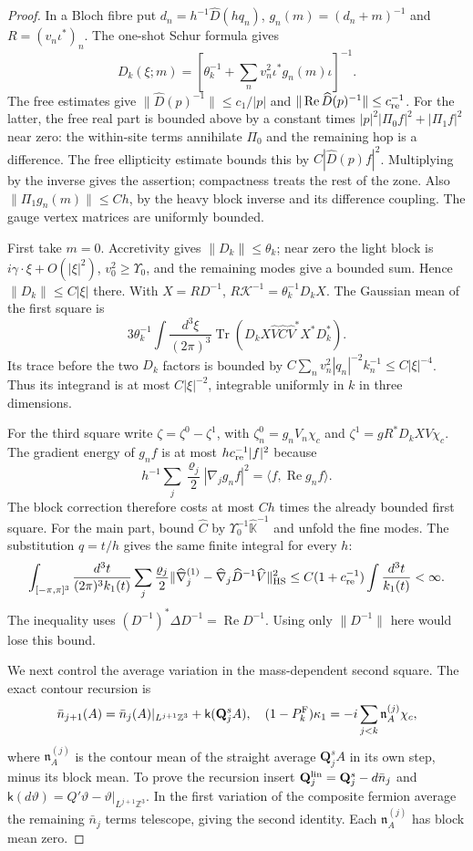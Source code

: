 \documentclass[11pt,letterpaper,reqno]{amsart}
\theoremstyle{definition}
\theoremstyle{remark}
\begin{document}
\begin{proof}
In a Bloch fibre put $d_n=h^{-1}\widehat D(hq_n)$,
$g_n(m)=(d_n+m)^{-1}$ and $R=(v_n\iota^*)_n$.
The one-shot Schur formula gives
\[
 D_k(\xi;m)=
 [\theta_k^{-1}+\sum_nv_n^2\iota^*g_n(m)\iota]^{-1}.
\]
The free estimates give
$\|\widehat D(p)^{-1}\|\le c_1/|p|$ and
$\|\operatorname{Re}\widehat D(p)^{-1}\|\le c_{\rm re}^{-1}$.
For the latter, the free real part is bounded above by a
constant times $|p|^2|\Pi_0f|^2+|\Pi_1f|^2$ near zero:
the within-site terms annihilate $\Pi_0$ and the remaining
hop is a difference.  The free ellipticity estimate bounds
this by $C|\widehat D(p)f|^2$.  Multiplying by the inverse
gives the assertion; compactness treats the rest of the zone.
Also $\|\Pi_1g_n(m)\|\le Ch$, by the heavy block inverse
and its difference coupling.  The gauge vertex matrices are
uniformly bounded.

First take $m=0$.  Accretivity gives $\|D_k\|\le\theta_k$;
near zero the light block is $i\gamma\cdot\xi+O(|\xi|^2)$,
$v_0^2\ge\Upsilon_0$, and the remaining modes give a bounded
sum.  Hence $\|D_k\|\le C|\xi|$ there.  With $X=RD^{-1}$,
$R\mathcal K^{-1}=\theta_k^{-1}D_kX$.
The Gaussian mean of the first square is
\[
 3\theta_k^{-1}\int\frac{d^3\xi}{(2\pi)^3}
 \operatorname{Tr}(D_kX\widehat V\widehat C
                    \widehat V^*X^*D_k^*).
\]
Its trace before the two $D_k$ factors is bounded by
$C\sum_nv_n^2|q_n|^{-2}k_n^{-1}\le C|\xi|^{-4}$.
Thus its integrand is at most $C|\xi|^{-2}$, integrable
uniformly in $k$ in three dimensions.

For the third square write
$\zeta=\zeta^0-\zeta^1$, with
$\zeta_n^0=g_nV_n\chi_c$ and
$\zeta^1=gR^*D_kX V\chi_c$.
The gradient energy of $g_nf$ is at most
$hc_{\rm re}^{-1}|f|^2$ because
\[
 h^{-1}\sum_j\frac{\varrho_j}2|\nabla_jg_nf|^2
       =\langle f,\operatorname{Re}g_nf\rangle.
\]
The block correction therefore costs at most $Ch$ times the
already bounded first square.  For the main part, bound
$\widehat C$ by $\Upsilon_0^{-1}\widehat{\mathbb K}^{-1}$
and unfold the fine modes.  The substitution $q=t/h$ gives
the same finite integral for every $h$:
\[
 \int_{[-\pi,\pi]^3}\frac{d^3t}{(2\pi)^3k_1(t)}
 \sum_j\frac{\varrho_j}2
  \|\widehat\nabla_j^{(1)}-
             \widehat\nabla_j\widehat D^{-1}\widehat V\|_{\rm HS}^2
 \le C(1+c_{\rm re}^{-1})\int\frac{d^3t}{k_1(t)}<\infty.
\]
The inequality uses
$(D^{-1})^*\Delta D^{-1}=\operatorname{Re}D^{-1}$.
Using only $\|D^{-1}\|$ here would lose this bound.

We next control the average variation in the mass-dependent
second square.  The exact contour recursion is
\[
 \bar n_{j+1}(A)=\bar n_j(A)|_{L^{j+1}\mathbb Z^3}
                        +\mathsf k(\mathbf Q_j^sA),
 \quad
 (1-P_k^{\rm F})\kappa_1=-i\sum_{j<k}\mathfrak n_A^{(j)}\chi_c,
\]
where $\mathfrak n_A^{(j)}$ is the contour mean of the
straight average $\mathbf Q_j^sA$ in its own step, minus its
block mean.  To prove the recursion insert
$\mathbf Q_j^{\rm lin}=\mathbf Q_j^s-d\bar n_j$ and
$\mathsf k(d\vartheta)=Q'\vartheta-
\vartheta|_{L^{j+1}\mathbb Z^3}$.  In the first variation
of the composite fermion average the remaining $\bar n_j$
terms telescope, giving the second identity.
Each $\mathfrak n_A^{(j)}$ has block mean zero.


\end{proof}
\end{document}
